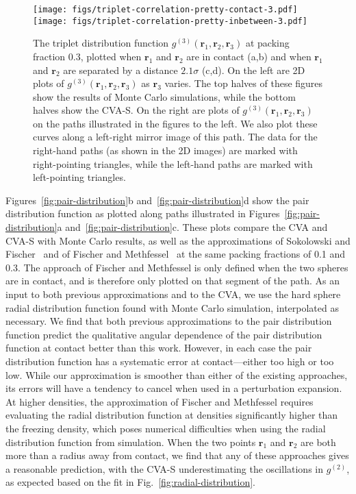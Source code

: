 \documentclass[letterpaper,twocolumn,amsmath,amssymb,pre,aps,10pt]{revtex4-1}
\newcommand{\rr}{\textbf{r}}
\begin{document}
\begin{figure*}
  \texttt{[image: figs/triplet-correlation-pretty-contact-3.pdf]}
  \vspace{-0.7cm}
\\
  \texttt{[image: figs/triplet-correlation-pretty-inbetween-3.pdf]}
  \vspace{-0.7cm}
  \caption{The triplet distribution function
    $g^{(3)}(\rr_1,\rr_2,\rr_3)$ at packing fraction 0.3, plotted when
    $\rr_1$ and $\rr_2$ are in contact (a,b) and when $\rr_1$ and
    $\rr_2$ are separated by a distance $2.1\sigma$ (c,d). On the left
    are 2D plots of $g^{(3)}(\rr_1,\rr_2,\rr_3)$ as $\rr_3$
    varies. %
%
    The top halves of these figures show the results of Monte Carlo
    simulations, while the bottom halves show the CVA-S.  On the right
    are plots of $g^{(3)}(\rr_1,\rr_2,\rr_3)$ on the paths illustrated
    in the figures to the left.
%
    We also plot these curves along a left-right mirror image of this
    path.  The data for the right-hand paths (as shown in the 2D
    images) are marked with right-pointing triangles, while the
    left-hand paths are marked with left-pointing triangles.
%
  }
  \label{fig:triplet-contact-distribution}
\end{figure*}

Figures~\ref{fig:pair-distribution}b and~\ref{fig:pair-distribution}d
show the pair distribution function as plotted along paths illustrated
in Figures~\ref{fig:pair-distribution}a
and~\ref{fig:pair-distribution}c.  These plots compare the CVA and
CVA-S with Monte Carlo results, as well as the approximations of
Sokolowski and Fischer~\cite{sokolowski1992role} and of Fischer and
Methfessel~\cite{fischer1980born} at the same packing fractions of 0.1 and 0.3.
The approach of Fischer and Methfessel is only defined when the two
spheres are in contact, and is therefore only plotted on that segment
of the path.  As an input to both previous approximations and to the
CVA, we use the hard sphere radial distribution function found with
Monte Carlo simulation, interpolated as necessary. We find that both
previous approximations to the pair distribution function predict the
qualitative angular dependence of the pair distribution function at
contact better than this work.  However, in each case the pair
distribution function has a systematic error at contact---either too
high or too low.  While our approximation is smoother than either
of the existing approaches, its errors will have a tendency to cancel
when used in a perturbation expansion.  At higher densities, the
approximation of Fischer and Methfessel requires evaluating the radial
distribution function at densities significantly higher than the
freezing density, which poses numerical difficulties when using the
radial distribution function from simulation.  When the two points
$\rr_1$ and $\rr_2$ are both
more than a radius away from contact, we find that any of these
approaches gives a reasonable prediction, with the CVA-S
underestimating the oscillations in $g^{(2)}$, as expected based on
the fit in Fig.~\ref{fig:radial-distribution}.
\end{document}
